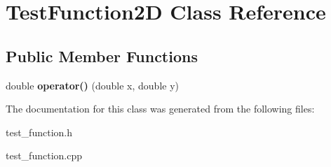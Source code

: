 \hypertarget{class_test_function2_d}{}\section{Test\+Function2\+D Class Reference}
\label{class_test_function2_d}
\subsection*{Public Member Functions}
\begin{DoxyCompactItemize}
\item 
\hypertarget{class_test_function2_d_ab18435ba26d2195e50385f3a77003e56}{}double {\bfseries operator()} (double x, double y)\label{class_test_function2_d_ab18435ba26d2195e50385f3a77003e56}

\end{DoxyCompactItemize}


The documentation for this class was generated from the following files\+:\begin{DoxyCompactItemize}
\item 
test\+\_\+function.\+h\item 
test\+\_\+function.\+cpp\end{DoxyCompactItemize}
